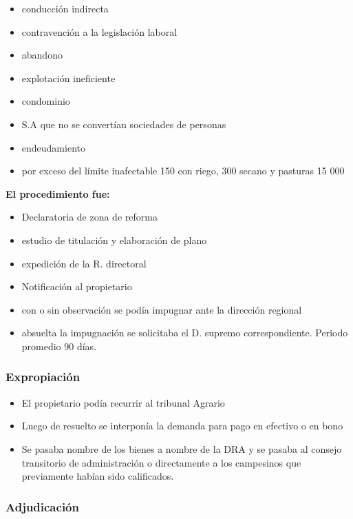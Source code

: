 \documentclass[
  a4paper,
]{article}
\providecommand{\tightlist}{%
  \setlength{\itemsep}{0pt}\setlength{\parskip}{0pt}}\usepackage{longtable,booktabs,array}
\begin{document}
\begin{itemize}
\tightlist
\item
  conducción indirecta
\item
  contravención a la legislación laboral
\item
  abandono
\item
  explotación ineficiente
\item
  condominio
\item
  S.A que no se convertían sociedades de personas
\item
  endeudamiento
\item
  por exceso del límite inafectable 150 con riego, 300 secano y pasturas
  15 000
\end{itemize}

\textbf{El procedimiento fue:}

\begin{itemize}
\tightlist
\item
  Declaratoria de zona de reforma
\item
  estudio de titulación y elaboración de plano
\item
  expedición de la R. directoral
\item
  Notificación al propietario
\item
  con o sin observación se podía impugnar ante la dirección regional
\item
  absuelta la impugnación se solicitaba el D. supremo correspondiente.
  Periodo promedio 90 días.
\end{itemize}

\hypertarget{expropiaciuxf3n}{%
\subsubsection{Expropiación}\label{expropiaciuxf3n}}

\begin{itemize}
\tightlist
\item
  El propietario podía recurrir al tribunal Agrario
\item
  Luego de resuelto se interponía la demanda para pago en efectivo o en
  bono
\item
  Se pasaba nombre de los bienes a nombre de la DRA y se pasaba al
  consejo transitorio de administración o directamente a los campesinos
  que previamente habían sido calificados.
\end{itemize}

\hypertarget{adjudicaciuxf3n}{%
\subsubsection{Adjudicación}\label{adjudicaciuxf3n}}
\end{document}
